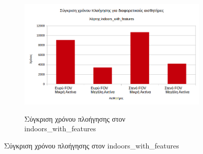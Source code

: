 \begin{figure}[H]
\begin{subfigure}[b]{0.5\textwidth}
         \includegraphics[width=\textwidth]{./images/chapter6/indoors_with_features_time_compare.png}
         \label{fig:indoors_with_features_time_compare}
         \caption{Σύγκριση χρόνου πλοήγησης στον indoors\_with\_features}
     \end{subfigure}
\end{figure}
